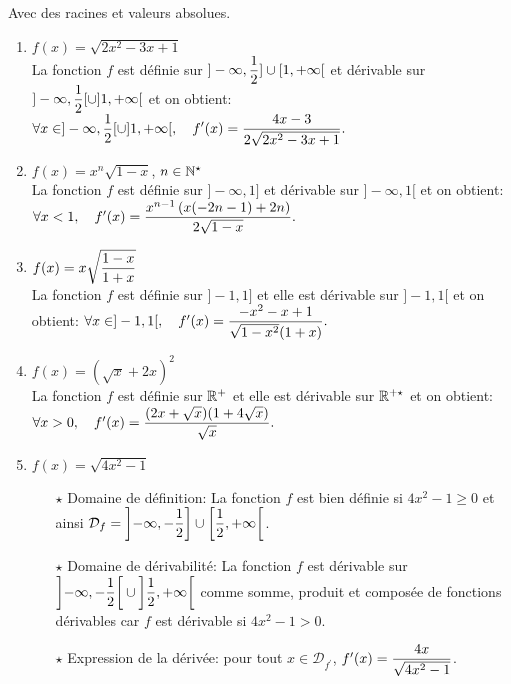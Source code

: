 \documentclass[a4paper, 11pt,reqno]{article}
\begin{document}
\begin{correction}  \; Avec des racines et valeurs absolues.\\
	\begin{enumerate}
		\item $f(x)=\sqrt{2x^2-3x+1}$\\
		      \noindent La fonction $f$ est d\'efinie sur $\rbrack -\infty ,\displaystyle\frac{1}{2}\rbrack\cup\lbrack 1,+\infty\lbrack$ et d\'erivable sur $\rbrack -\infty ,\displaystyle\frac{1}{2}\lbrack\cup\rbrack 1,+\infty\lbrack$ et on obtient:
		      $\forall x\in\rbrack -\infty ,\displaystyle\frac{1}{2}\lbrack\cup\rbrack 1,+\infty\lbrack,\quad f^{\prime}(x)=\displaystyle\frac{4x-3}{2\sqrt{2x^2-3x+1}}.$
		\item $f(x)=x^n\sqrt{1-x}$, $n\in\mathbb{N}^{\star}$\\
		      \noindent  La fonction $f$ est d\'efinie sur $\rbrack -\infty,1\rbrack$ et d\'erivable sur $\rbrack -\infty,1\lbrack$ et on obtient:\\
		      \noindent $\forall x<1,\quad f^{\prime}(x)=\displaystyle\frac{x^{n-1}\left( x(-2n-1)+2n \right)}{2\sqrt{1-x}}.$
		\item $f(x)=x\displaystyle\sqrt{\displaystyle\frac{1-x}{1+x}}$\\
		      \noindent  La fonction $f$ est d\'efinie sur $\rbrack -1,1\rbrack$ et elle est d\'erivable sur $\rbrack -1,1\lbrack$ et on obtient:
		      $\forall x\in\rbrack -1,1\lbrack,\quad f^{\prime}(x)= \displaystyle\frac{-x^2-x+1}{\sqrt{1-x^2}(1+x)}.$
		\item $f(x)=(\sqrt{x}+2x)^2$\\
		      \noindent La fonction $f$ est d\'efinie sur $\mathbb{R}^{+}$ et elle est d\'erivable sur $\mathbb{R}^{+\star}$ et on obtient:\\
		      \noindent $\forall x>0,\quad f^{\prime}(x)=\displaystyle\frac{(2x+\sqrt{x})(1+4\sqrt{x})}{\sqrt{x}}.$
		\item $f(x)=\sqrt{4x^2-1}$
		      \begin{itemize}
			      \item[$\star$] Domaine de d\'efinition: La fonction $f$ est bien d\'efinie si $4x^2-1\geq 0$ et ainsi $\mathcal{D}_f=\left\rbrack -\infty,-\displaystyle\frac{1}{2}\right\rbrack\cup\left\lbrack \displaystyle\frac{1}{2},+\infty\right\lbrack $.
			      \item[$\star$] Domaine de d\'erivabilit\'e: La fonction $f$ est d\'erivable sur $\left\rbrack -\infty,-\displaystyle\frac{1}{2}\right\lbrack\cup\left\rbrack \displaystyle\frac{1}{2},+\infty\right\lbrack $ comme somme, produit et compos\'ee de fonctions d\'erivables car $f$ est d\'erivable si $4x^2-1>0$.
			      \item[$\star$] Expression de la d\'eriv\'ee: pour tout $x\in\mathcal{D}_{f^{\prime}}$, $f^{\prime}(x)=\displaystyle\frac{4x}{\sqrt{4x^2-1}}$.

\end{itemize}
\end{enumerate}
\end{correction}
\end{document}
